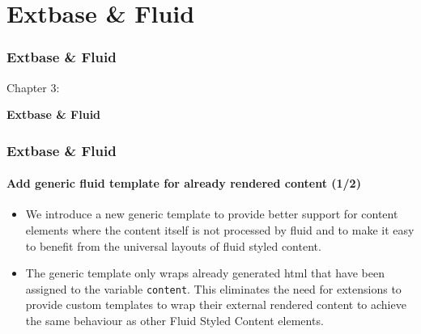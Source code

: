 %

\section{Extbase \& Fluid}
\begin{frame}[fragile]
	\frametitle{Extbase \& Fluid}

	\begin{center}\huge{Chapter 3:}\end{center}
	\begin{center}\huge{\color{typo3darkgrey}\textbf{Extbase \& Fluid}}\end{center}

\end{frame}


\begin{frame}[fragile]
	\frametitle{Extbase \& Fluid}
	\framesubtitle{Add generic fluid template for already rendered content (1/2)}

	\begin{itemize}
		\item We introduce a new generic template to provide better support for content elements
			where the content itself is not processed by fluid and to make it easy to benefit
			from the universal layouts of fluid styled content.

		\item The generic template only wraps already generated html that have been assigned
			to the variable \texttt{content}. This eliminates the need for extensions to provide
			custom templates to wrap their external rendered content to achieve the same behaviour
			as other Fluid Styled Content elements.

	\end{itemize}

\end{frame}


